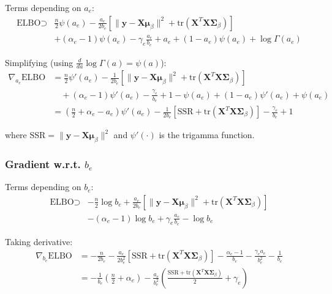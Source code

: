 \documentclass[11pt]{article}
\newcommand{\ELBO}{\text{ELBO}}
\newcommand{\tr}{\text{tr}}
\begin{document}
Terms depending on $a_e$:
\begin{align}
\ELBO \supset &\frac{n}{2}\psi(a_e) - \frac{a_e}{2b_e}\left[\|\bm{y} - \bm{X}\bm{\mu}_\beta\|^2 + \tr(\bm{X}^T\bm{X}\bm{\Sigma}_\beta)\right] \nonumber\\
&+ (\alpha_e - 1)\psi(a_e) - \gamma_e \frac{a_e}{b_e} + a_e + (1-a_e)\psi(a_e) + \log\Gamma(a_e)
\end{align}

Simplifying (using $\frac{d}{da}\log\Gamma(a) = \psi(a)$):
\begin{align}
\nabla_{a_e} \ELBO &= \frac{n}{2}\psi'(a_e) - \frac{1}{2b_e}\left[\|\bm{y} - \bm{X}\bm{\mu}_\beta\|^2 + \tr(\bm{X}^T\bm{X}\bm{\Sigma}_\beta)\right] \nonumber\\
&\quad + (\alpha_e - 1)\psi'(a_e) - \frac{\gamma_e}{b_e} + 1 - \psi(a_e) + (1-a_e)\psi'(a_e) + \psi(a_e) \nonumber\\
&= \left(\frac{n}{2} + \alpha_e - a_e\right)\psi'(a_e) - \frac{1}{2b_e}\left[\text{SSR} + \tr(\bm{X}^T\bm{X}\bm{\Sigma}_\beta)\right] - \frac{\gamma_e}{b_e} + 1
\label{eq:grad_a}
\end{align}

where $\text{SSR} = \|\bm{y} - \bm{X}\bm{\mu}_\beta\|^2$ and $\psi'(\cdot)$ is the trigamma function.

\subsubsection{Gradient w.r.t. \texorpdfstring{$b_e$}{b_e}}

Terms depending on $b_e$:
\begin{align}
\ELBO \supset &-\frac{n}{2}\log b_e + \frac{a_e}{2b_e}\left[\|\bm{y} - \bm{X}\bm{\mu}_\beta\|^2 + \tr(\bm{X}^T\bm{X}\bm{\Sigma}_\beta)\right] \nonumber\\
&- (\alpha_e - 1)\log b_e + \gamma_e \frac{a_e}{b_e} - \log b_e
\end{align}

Taking derivative:
\begin{align}
\nabla_{b_e} \ELBO &= -\frac{n}{2b_e} - \frac{a_e}{2b_e^2}\left[\text{SSR} + \tr(\bm{X}^T\bm{X}\bm{\Sigma}_\beta)\right] - \frac{\alpha_e - 1}{b_e} - \frac{\gamma_e a_e}{b_e^2} - \frac{1}{b_e} \nonumber\\
&= -\frac{1}{b_e}\left(\frac{n}{2} + \alpha_e\right) - \frac{a_e}{b_e^2}\left(\frac{\text{SSR} + \tr(\bm{X}^T\bm{X}\bm{\Sigma}_\beta)}{2} + \gamma_e\right)
\label{eq:grad_b}
\end{align}
\end{document}
